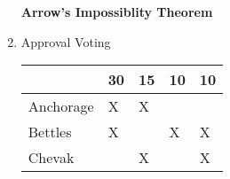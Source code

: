 \documentclass[12pt]{article}
\renewcommand{\emph}[1]{\textsf{\textbf{#1}}}
\begin{document}
\begin{enumerate}
\vfill

\emph{Arrow's Impossiblity Theorem}

\vspace{1 in}

\item Approval Voting\\

\begin{tabular}{l || llll}
& 30&15&10&10\\
\hline
Anchorage&X&X&&\\
Bettles&X&&X&X\\ 
Chevak&&X&&X\\
\end{tabular}
\vfill

\end{enumerate}
%
%
%
%
%
%
\end{document}
